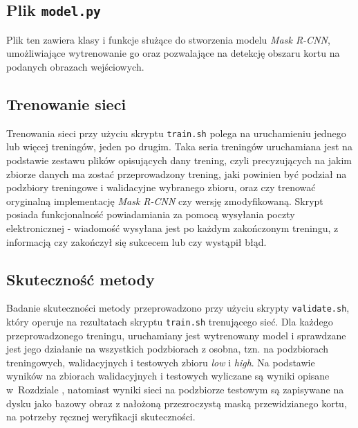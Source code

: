 \subsection*{Plik \texttt{model.py}}

Plik ten zawiera klasy i funkcje służące do stworzenia modelu \textit{Mask R-CNN}, umożliwiające wytrenowanie go oraz pozwalające na detekcję obszaru kortu na podanych obrazach wejściowych.

\subsection*{Trenowanie sieci}

Trenowania sieci przy użyciu skryptu \texttt{train.sh} polega na uruchamieniu jednego lub więcej treningów, jeden po drugim. Taka seria treningów uruchamiana jest na podstawie zestawu plików opisujących dany trening, czyli precyzujących na jakim zbiorze danych ma zostać przeprowadzony trening, jaki powinien być podział na podzbiory treningowe i walidacyjne wybranego zbioru, oraz czy trenować oryginalną implementację \textit{Mask R-CNN} czy wersję zmodyfikowaną. Skrypt posiada funkcjonalność powiadamiania za pomocą wysyłania poczty elektronicznej - wiadomość wysyłana jest po każdym zakończonym treningu, z informacją czy zakończył się sukcecem lub czy wystąpił błąd.

\subsection*{Skuteczność metody}

Badanie skuteczności metody przeprowadzono przy użyciu skrypty \texttt{validate.sh}, który operuje na rezultatach skryptu \texttt{train.sh} trenującego sieć.
Dla każdego przeprowadzonego treningu, uruchamiany jest wytrenowany model i sprawdzane jest jego działanie na wszystkich podzbiorach z osobna, tzn. na podzbiorach treningowych, walidacyjnych i testowych zbioru \textit{low} i \textit{high}. Na podstawie wyników na zbiorach walidacyjnych i testowych wyliczane są wyniki opisane w~Rozdziale , natomiast wyniki sieci na podzbiorze testowym są zapisywane na dysku jako bazowy obraz z nałożoną przezroczystą maską przewidzianego kortu, na potrzeby ręcznej weryfikacji skuteczności.
